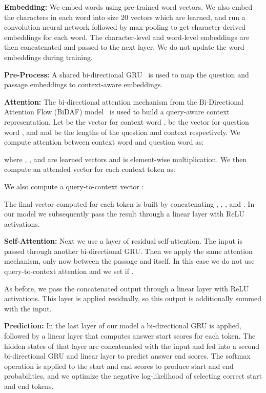 \documentclass[11pt,a4paper]{article}
\begin{document}
\textbf{Embedding:}
We embed words using pre-trained word vectors. We also embed the characters in each word into size 20 vectors which are learned, and run a convolution neural network followed by max-pooling to get character-derived embeddings for each word. The character-level and word-level embeddings are then concatenated and passed to the next layer. We do not update the word embeddings during training.

\textbf{Pre-Process:}
A shared bi-directional GRU~\cite{cho2014learning} is used to map the question and passage embeddings to context-aware embeddings. 

\textbf{Attention:}
The bi-directional attention mechanism from the Bi-Directional Attention Flow (BiDAF) model~\cite{bidaf} is used to build a query-aware context representation. Let  be the vector for context word ,  be the vector for question word , and  and  be the lengths of the question and context respectively. We compute attention between context word  and question word  as:

where , , and  are learned vectors and  is element-wise multiplication. We then compute an attended vector  for each context token as:



We also compute a query-to-context vector :




The final vector computed for each token is built by concatenating , , , and . In our model we subsequently pass the result through a linear layer with ReLU activations.

\textbf{Self-Attention:}
Next we use a layer of residual self-attention. The input is passed through another bi-directional GRU. Then we apply the same attention mechanism, only now between the passage and itself. In this case we do not use query-to-context attention and we set  if .

As before, we pass the concatenated output through a linear layer with ReLU activations. This layer is applied residually, so this output is additionally summed with the input.

\textbf{Prediction:}
In the last layer of our model a bi-directional GRU is applied, followed by a linear layer that computes answer start scores for each token. The hidden states of that layer are concatenated with the input and fed into a second bi-directional GRU and linear layer to predict answer end scores. The softmax operation is applied to the start and end scores to produce start and end probabilities, and we optimize the negative log-likelihood of selecting correct start and end tokens.
\end{document}
